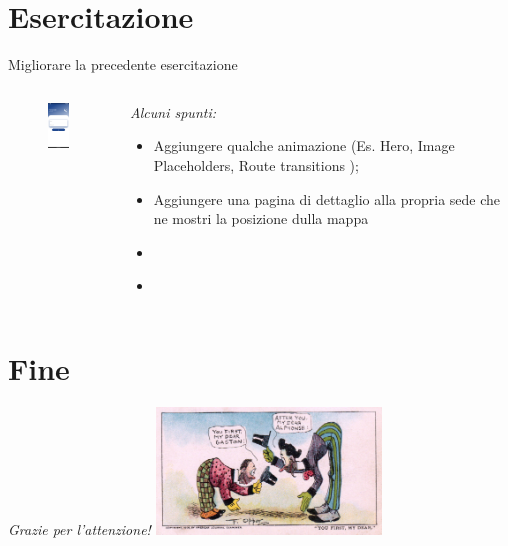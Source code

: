 \documentclass{../libs/presentation_format}
\begin{document}
\section{Esercitazione}
\begin{frame}{Migliorare la precedente esercitazione}
	\begin{minipage}[0.2\textheight]{\textwidth}
		\begin{columns}[T]
			\begin{column}{0.4\textwidth}
				\begin{figure}[htpb]
					\centering
					\includegraphics[width=2cm]{../libs/login-page}
				\end{figure}
			\end{column}
			\begin{column}{0.6\textwidth}
				\emph{Alcuni spunti:}
				\begin{itemize}
					\item Aggiungere qualche animazione (Es. Hero, Image Placeholders, Route transitions );
					\item Aggiungere una pagina di dettaglio alla propria sede che ne mostri la posizione dulla mappa
					\item \href{https://docs.flutter.dev/cookbook/images/fading-in-images}{}
					\item \href{https://pub.dev/packages/flutter_map}{}
				\end{itemize}
			\end{column}
		\end{columns}
	\end{minipage}
\end{frame}



\section{Fine}
\begin{frame}{}
	\huge\emph{Grazie per l'attenzione!}
	\newline
	\vfill
	\hfill\includegraphics[width=6cm]{../libs/alphonse-gaston-regards}
\end{frame}
\end{document}
